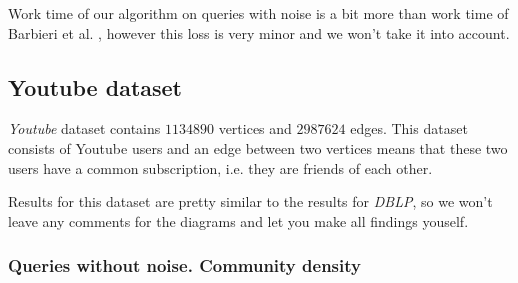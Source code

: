   \begin{center}
  \end{center}

Work time of our algorithm on queries with noise is a bit more than work time of Barbieri et al. \cite{Barbieri15}, however this loss is very minor and we won't take it into account.

\subsection{Youtube dataset}

\textit{Youtube} dataset contains $1134890$ vertices and $2987624$ edges. This dataset consists of Youtube users and an edge between two vertices means that these two users have a common subscription, i.e. they are friends of each other.

Results for this dataset are pretty similar to the results for \textit{DBLP}, so we won't leave any comments for the diagrams and let you make all findings youself.

\subsubsection{Queries without noise. Community density}

